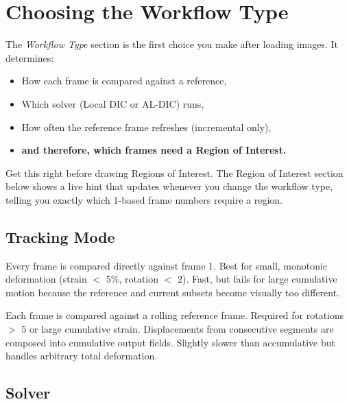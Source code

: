 \section{Choosing the Workflow Type}
\label{sec:workflow-type}

The \emph{Workflow Type} section is the first choice you make after
loading images. It determines:
\begin{itemize}
  \item How each frame is compared against a reference,
  \item Which solver (Local DIC or AL-DIC) runs,
  \item How often the reference frame refreshes (incremental only),
  \item \textbf{and therefore, which frames need a Region of Interest.}
\end{itemize}

\begin{tipbox}
Get this right before drawing Regions of Interest. The Region of
Interest section below shows a live hint that updates whenever you
change the workflow type, telling you exactly which 1-based frame
numbers require a region.
\end{tipbox}

\subsection{Tracking Mode}

\begin{description}[leftmargin=1.2cm,style=nextline]
  \item[Accumulative]
    Every frame is compared directly against frame 1. Best for small,
    monotonic deformation (strain $<$ 5\%, rotation $<$ 2\textdegree).
    Fast, but fails for large cumulative motion because the reference
    and current subsets become visually too different.
  \item[Incremental]
    Each frame is compared against a rolling reference frame.
    Required for rotations $>$ 5\textdegree{} or large cumulative
    strain. Displacements from consecutive segments are composed into
    cumulative output fields. Slightly slower than accumulative but
    handles arbitrary total deformation.
\end{description}

\subsection{Solver}

